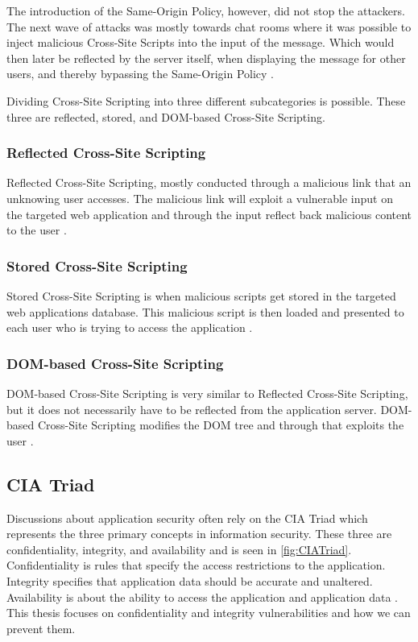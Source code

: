 The introduction of the Same-Origin Policy, however, did not stop the attackers. The next wave of attacks was mostly towards chat rooms where it was possible to inject malicious Cross-Site Scripts into the input of the message. Which would then later be reflected by the server itself, when displaying the message for other users, and thereby bypassing the Same-Origin Policy \parencite{FogieSeth2007Xacs}.

Dividing Cross-Site Scripting into three different subcategories is possible. These three are reflected, stored, and DOM-based Cross-Site Scripting.



\subsubsection{Reflected Cross-Site Scripting}
Reflected Cross-Site Scripting, mostly conducted through a malicious link that an unknowing user accesses. The malicious link will exploit a vulnerable input on the targeted web application and through the input reflect back malicious content to the user \parencite{Secure_Web}.



\subsubsection{Stored Cross-Site Scripting}
Stored Cross-Site Scripting is when malicious scripts get stored in the targeted web applications database. This malicious script is then loaded and presented to each user who is trying to access the application \parencite{Secure_Web}.



\subsubsection{DOM-based Cross-Site Scripting}
DOM-based Cross-Site Scripting is very similar to Reflected Cross-Site Scripting, but it does not necessarily have to be reflected from the application server. DOM-based Cross-Site Scripting modifies the DOM tree and through that exploits the user \parencite{Secure_Web}.



\subsection{CIA Triad}
Discussions about application security often rely on the CIA Triad which represents the three primary concepts in information security. These three are confidentiality, integrity, and availability and is seen in \ref{fig:CIATriad}. Confidentiality is rules that specify the access restrictions to the application. Integrity specifies that application data should be accurate and unaltered. Availability is about the ability to access the application and application data \parencite{2014C1-W}. This thesis focuses on confidentiality and integrity vulnerabilities and how we can prevent them.

